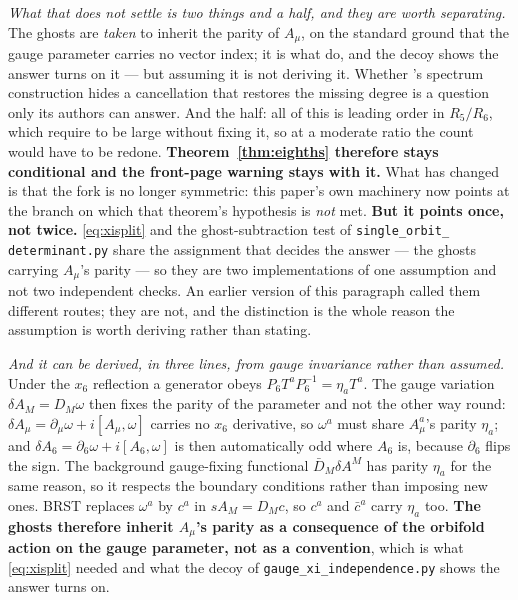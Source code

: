 \documentclass[11pt,a4paper]{article}
\begin{document}
\begin{itemize}
\emph{What that does not settle is two things and a half, and they are worth separating.} The
ghosts are \emph{taken} to inherit the parity of $A_\mu$, on the standard ground that the gauge
parameter carries no vector index; it is what \cite{HNT} do, and the decoy shows the answer turns
on it --- but assuming it is not deriving it. Whether \cite{KM25}'s spectrum construction hides a
cancellation that restores the missing degree is a question only its authors can answer. And the
half: all of this is leading order in $R_5/R_6$, which \cite{KM25} require to be large without
fixing it, so at a moderate ratio the count would have to be redone. \textbf{Theorem~\ref{thm:eighths}
therefore stays conditional and the front-page warning stays with it.} What has changed is that the
fork is no longer symmetric: this paper's own machinery now points at the branch on which that
theorem's hypothesis is \emph{not} met. \textbf{But it points once, not twice.} \eqref{eq:xisplit}
and the ghost-subtraction test of \texttt{single\_\allowbreak orbit\_\allowbreak
determinant.py} share the assignment that decides the answer --- the ghosts carrying $A_\mu$'s
parity --- so they are two implementations of one assumption and not two independent checks. An
earlier version of this paragraph called them different routes; they are not, and the distinction
is the whole reason the assumption is worth deriving rather than stating.

\emph{And it can be derived, in three lines, from gauge invariance rather than assumed.} Under the
$x_6$ reflection a generator obeys $P_6T^aP_6^{-1}=\eta_aT^a$. The gauge variation
$\delta A_M=D_M\omega$ then fixes the parity of the parameter and not the other way round:
$\delta A_\mu=\partial_\mu\omega+i[A_\mu,\omega]$ carries no $x_6$ derivative, so $\omega^a$ must
share $A_\mu^a$'s parity $\eta_a$; and $\delta A_6=\partial_6\omega+i[A_6,\omega]$ is then
automatically odd where $A_6$ is, because $\partial_6$ flips the sign. The background gauge-fixing
functional $\bar D_M\delta A^M$ has parity $\eta_a$ for the same reason, so it respects the
boundary conditions rather than imposing new ones. BRST replaces $\omega^a$ by $c^a$ in
$sA_M=D_Mc$, so $c^a$ and $\bar c^a$ carry $\eta_a$ too. \textbf{The ghosts therefore inherit
$A_\mu$'s parity as a consequence of the orbifold action on the gauge parameter, not as a
convention}, which is what \eqref{eq:xisplit} needed and what the decoy of
\texttt{gauge\_\allowbreak xi\_\allowbreak independence.py} shows the answer turns on.


\end{itemize}
\end{document}
